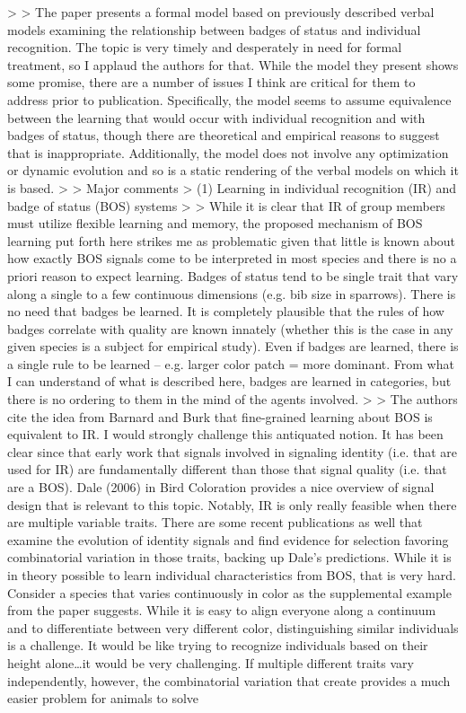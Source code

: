>
> The paper presents a formal model based on previously described verbal models examining the relationship between badges of status and individual recognition. The topic is very timely and desperately in need for formal treatment, so I applaud the authors for that. While the model they present shows some promise, there are a number of issues I think are critical for them to address prior to publication. Specifically, the model seems to assume equivalence between the learning that would occur with individual recognition and with badges of status, though there are theoretical and empirical reasons to suggest that is inappropriate. Additionally, the model does not involve any optimization or dynamic evolution and so is a static rendering of the verbal models on which it is based.
>
> Major comments
> (1) Learning in individual recognition (IR) and badge of status (BOS) systems
>
> While it is clear that IR of group members must utilize flexible learning and memory, the proposed mechanism of BOS learning put forth here strikes me as problematic given that little is known about how exactly BOS signals come to be interpreted in most species and there is no a priori reason to expect learning. Badges of status tend to be single trait that vary along a single to a few continuous dimensions (e.g. bib size in sparrows). There is no need that badges be learned. It is completely plausible that the rules of how badges correlate with quality are known innately (whether this is the case in any given species is a subject for empirical study). Even if badges are learned, there is a single rule to be learned – e.g. larger color patch = more dominant. From what I can understand of what is described here, badges are learned in categories, but there is no ordering to them in the mind of the agents involved.
>
> The authors cite the idea from Barnard and Burk that fine-grained learning about BOS is equivalent to IR. I would strongly challenge this antiquated notion. It has been clear since that early work that signals involved in signaling identity (i.e. that are used for IR) are fundamentally different than those that signal quality (i.e. that are a BOS). Dale (2006) in Bird Coloration provides a nice overview of signal design that is relevant to this topic. Notably, IR is only really feasible when there are multiple variable traits. There are some recent publications as well that examine the evolution of identity signals and find evidence for selection favoring combinatorial variation in those traits, backing up Dale’s predictions. While it is in theory possible to learn individual characteristics from BOS, that is very hard. Consider a species that varies continuously in color as the supplemental example from the paper suggests. While it is easy to align everyone along a continuum and to differentiate between very different color, distinguishing similar individuals is a challenge. It would be like trying to recognize individuals based on their height alone…it would be very challenging. If multiple different traits vary independently, however, the combinatorial variation that create provides a much easier problem for animals to solve
